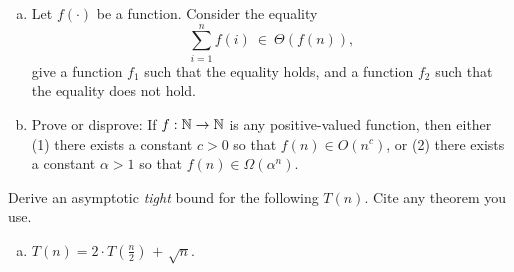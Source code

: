 \begin{qunlist}
\begin{enumerate}[(a)]
\vspace{2cm}

\item Let $f(\cdot)$ be a function. Consider the equality
\[\sum_{i=1}^{n}f(i)\ \in \ \Theta(f(n)),\]
give a function $f_1$ such that the equality holds, and a function $f_2$ such that the equality does not hold.\\


\item Prove or disprove: If $f:\mathbb{N}\to\mathbb{N}$ is any positive-valued function,
then either (1) there exists a constant $c>0$ so that
$f(n) \in O(n^c)$, or (2) there exists a constant $\alpha>1$ so that
$f(n) \in \Omega(\alpha^n)$.

\answer{}
  
\end{enumerate}



Derive an asymptotic {\em tight} bound for the following $T(n)$. Cite any theorem you use.

\begin{enumerate}[(a)]

\item $T(n)=2\cdot T(\frac{n}{2})$ $+$ $\sqrt n$.

\answer{}


\end{enumerate}
\end{qunlist}
